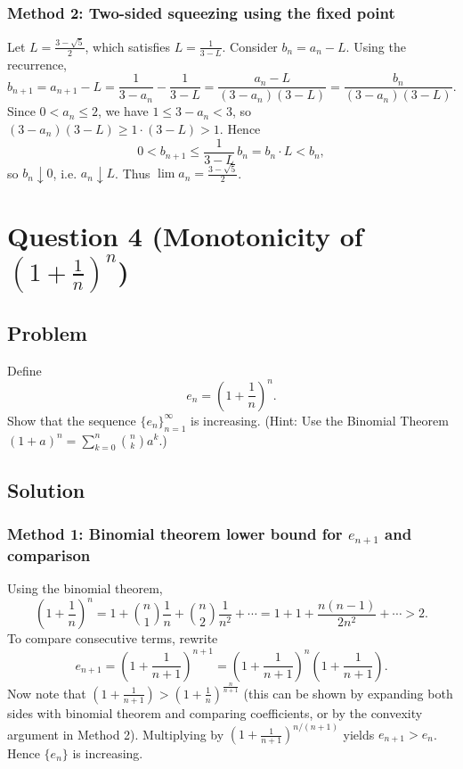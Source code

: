 \documentclass[12pt]{article}
\begin{document}
\subsubsection*{Method 2: Two-sided squeezing using the fixed point}

Let \(L=\frac{3-\sqrt{5}}{2}\), which satisfies \(L=\frac{1}{3-L}\). Consider \(b_n=a_n-L\). Using the recurrence,
\[
b_{n+1}=a_{n+1}-L=\frac{1}{3-a_n}-\frac{1}{3-L}
=\frac{a_n-L}{(3-a_n)(3-L)}
=\frac{b_n}{(3-a_n)(3-L)}.
\]
Since \(0<a_n\le 2\), we have \(1\le 3-a_n<3\), so \((3-a_n)(3-L)\ge 1\cdot (3-L)>1\). Hence
\[
0<b_{n+1}\le \frac{1}{3-L}\,b_n=b_n\cdot L < b_n,
\]
so \(b_n\downarrow 0\), i.e. \(a_n\downarrow L\). Thus \(\boxed{\lim a_n=\frac{3-\sqrt{5}}{2}}\).

\newpage


\section*{Question 4 (Monotonicity of \(\left(1+\frac{1}{n}\right)^n\))}

\subsection*{Problem}
Define
\[
e_n=\left(1+\frac{1}{n}\right)^n.
\]
Show that the sequence \(\{e_n\}_{n=1}^{\infty}\) is increasing.
\quad (Hint: Use the Binomial Theorem \((1+a)^n=\sum_{k=0}^{n}\binom{n}{k}a^k\).)

\subsection*{Solution}

\subsubsection*{Method 1: Binomial theorem lower bound for \(e_{n+1}\) and comparison}

Using the binomial theorem,
\[
\left(1+\frac{1}{n}\right)^n
=1+\binom{n}{1}\frac{1}{n}+\binom{n}{2}\frac{1}{n^2}+\cdots
=1+1+\frac{n(n-1)}{2n^2}+\cdots
>2.
\]
To compare consecutive terms, rewrite
\[
e_{n+1}=\left(1+\frac{1}{n+1}\right)^{n+1}
=\left(1+\frac{1}{n+1}\right)^n\left(1+\frac{1}{n+1}\right).
\]
Now note that \(\left(1+\frac{1}{n+1}\right) > \left(1+\frac{1}{n}\right)^{\frac{n}{n+1}}\) (this can be shown by expanding both sides with binomial theorem and comparing coefficients, or by the convexity argument in Method 2). Multiplying by \(\left(1+\frac{1}{n+1}\right)^{n/(n+1)}\) yields \(e_{n+1}>e_n\). Hence \(\{e_n\}\) is increasing.
\end{document}
